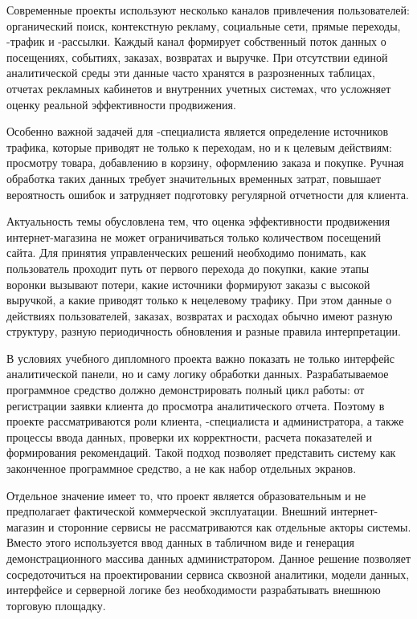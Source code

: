 
Современные  проекты используют несколько каналов привлечения пользователей: органический поиск, контекстную рекламу, социальные сети, прямые переходы, -трафик и -рассылки. Каждый канал формирует собственный поток данных о посещениях, событиях, заказах, возвратах и выручке. При отсутствии единой аналитической среды эти данные часто хранятся в разрозненных таблицах, отчетах рекламных кабинетов и внутренних учетных системах, что усложняет оценку реальной эффективности продвижения.

Особенно важной задачей для -специалиста является определение источников трафика, которые приводят не только к переходам, но и к целевым действиям: просмотру товара, добавлению в корзину, оформлению заказа и покупке. Ручная обработка таких данных требует значительных временных затрат, повышает вероятность ошибок и затрудняет подготовку регулярной отчетности для клиента.

Актуальность темы обусловлена тем, что оценка эффективности продвижения интернет-магазина не может ограничиваться только количеством посещений сайта. Для принятия управленческих решений необходимо понимать, как пользователь проходит путь от первого перехода до покупки, какие этапы воронки вызывают потери, какие источники формируют заказы с высокой выручкой, а какие приводят только к нецелевому трафику. При этом данные о действиях пользователей, заказах, возвратах и расходах обычно имеют разную структуру, разную периодичность обновления и разные правила интерпретации.

В условиях учебного дипломного проекта важно показать не только интерфейс аналитической панели, но и саму логику обработки данных. Разрабатываемое программное средство должно демонстрировать полный цикл работы: от регистрации заявки клиента до просмотра аналитического отчета. Поэтому в проекте рассматриваются роли клиента, -специалиста и администратора, а также процессы ввода данных, проверки их корректности, расчета показателей и формирования рекомендаций. Такой подход позволяет представить систему как законченное программное средство, а не как набор отдельных экранов.

Отдельное значение имеет то, что проект является образовательным и не предполагает фактической коммерческой эксплуатации. Внешний интернет-магазин и сторонние сервисы не рассматриваются как отдельные акторы системы. Вместо этого используется ввод данных в табличном виде и генерация демонстрационного массива данных администратором. Данное решение позволяет сосредоточиться на проектировании сервиса сквозной аналитики, модели данных, интерфейсе и серверной логике без необходимости разрабатывать внешнюю торговую площадку.

